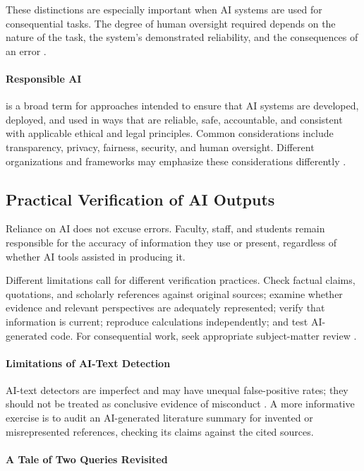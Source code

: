 \documentclass[11pt]{article}
\begin{document}
These distinctions are especially important when AI
systems are used for consequential tasks. The degree
of human oversight required depends on the nature of
the task, the system's demonstrated reliability, and
the consequences of an error \citep{NIST2024GenAI}.

\paragraph{Responsible AI} is a broad term for approaches intended to ensure that AI systems are developed, deployed, and used in ways that are reliable, safe, accountable, and consistent with applicable ethical and legal principles. Common considerations include transparency, privacy, fairness, security, and human oversight. Different organizations and frameworks may emphasize these considerations differently \citep{NIST2023AIRMF}.


\subsection{Practical Verification of AI Outputs}

Reliance on AI does not excuse errors. Faculty, staff,
and students remain responsible for the accuracy of
information they use or present, regardless of whether
AI tools assisted in producing it.

Different limitations call for different verification practices.
Check factual claims, quotations, and scholarly references
against original sources; examine whether evidence and relevant
perspectives are adequately represented; verify that information
is current; reproduce calculations independently; and test
AI-generated code. For consequential work, seek appropriate
subject-matter review \citep{Ji2023Hallucination,Bender2021Parrots,NIST2024GenAI,Kasneci2023Education}.

\paragraph{Limitations of AI-Text Detection}
AI-text detectors are imperfect and may have unequal
false-positive rates; they should not be treated as
conclusive evidence of misconduct \citep{Liang2023Detectors}.
A more informative exercise is to audit an AI-generated
literature summary for invented or misrepresented references,
checking its claims against the cited sources.

\paragraph{A Tale of Two Queries Revisited}
\end{document}
